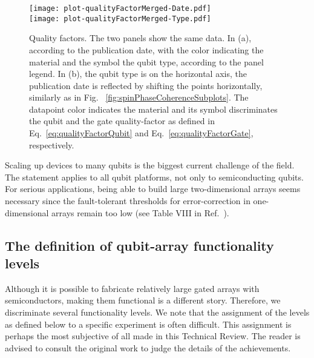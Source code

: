 \documentclass[aps, prx, showpacs, twocolumn, superscriptaddress, notitlepage, longbibliography, floatfix, nofootinbib]{revtex4-2}
\begin{document}
\begin{figure}
  \texttt{[image: plot-qualityFactorMerged-Date.pdf]}\\
    \texttt{[image: plot-qualityFactorMerged-Type.pdf]}
 \caption{
  \label{fig:qualityFactor}
Quality factors. The two panels show the same data. In (a), according to the publication date, with the color indicating the material and the symbol the qubit type, according to the panel legend. In (b), the qubit type is on the horizontal axis, the publication date is reflected by shifting the points horizontally, similarly as in Fig. ~\ref{fig:spinPhaseCoherenceSubplots}. The datapoint color indicates the material and its symbol discriminates the qubit and the gate quality-factor as defined in Eq.~\eqref{eq:qualityFactorQubit} and Eq.~\eqref{eq:qualityFactorGate}, respectively.
  }
\end{figure}



\label{sec:size}

Scaling up devices to many qubits is the biggest current challenge of the field. The statement applies to all qubit platforms, not only to semiconducting qubits. For serious applications, being able to build large two-dimensional arrays seems necessary since the fault-tolerant thresholds for error-correction in one-dimensional arrays remain too low (see Table VIII in Ref.~\cite{devitt_quantum_2013}). 

\subsection{The definition of qubit-array functionality levels}

\label{sec:arrayFunctionality}

Although it is possible to fabricate relatively large gated arrays with semiconductors, making them functional is a different story. Therefore, we discriminate several functionality levels. We note that the assignment of the levels as defined below to a specific experiment is often difficult. This assignment is perhaps the most subjective of all made in this Technical Review. The reader is advised to consult the original work to judge the details of the achievements. 
\end{document}
